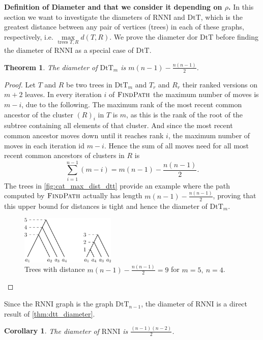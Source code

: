 \documentclass[11pt]{amsart}
\newtheorem{theorem}{Theorem}
\newtheorem{corollary}{Corollary}
\newcommand{\rnni}{\mathrm{RNNI}}
\newcommand{\findpath}{\textsc{FindPath}}
\newcommand{\dtt}{\mathrm{DtT}}
\newcommand{\summary}[1]{\textbf{#1}} %
\begin{document}
\summary{Definition of Diameter and that we consider it depending on $\rho$.}
In this section we want to investigate the diameters of $\rnni$ and $\dtt$, which is the greatest distance between any pair of vertices (trees) in each of these graphs, respectively, i.e. $\max\limits_{\text{trees }T,R}d(T,R)$.
We prove the diameter dor $\dtt$ before finding the diameter of $\rnni$ as a special case of $\dtt$.


\begin{theorem}
	The diameter of $\dtt_m$ is $m(n-1) - \frac{n(n-1)}{2}$.
	\label{thm:dtt_diameter}
\end{theorem}

\begin{proof}
	Let $T$ and $R$ be two trees in $\dtt_m$ and $T_r$ and $R_r$ their ranked versions on $m+2$ leaves.
	In every iteration $i$ of $\findpath$ the maximum number of moves is $m-i$, due to the following.
	The maximum rank of the most recent common ancestor of the cluster $(R)_i$ in $T$ is $m$, as this is the rank of the root of the subtree containing all elements of that cluster.
	And since the most recent common ancestor moves down until it reaches rank $i$, the maximum number of moves in each iteration id $m-i$.
	Hence the sum of all moves need for  all most recent common ancestors of clusters in $R$ is
	\[\sum\limits_{i = 1}^{n-1} (m - i) = m(n-1) - \frac{n(n-1)}{2}.\]
	The trees in \autoref{fig:cat_max_dist_dtt} provide an example where the path computed by $\findpath$ actually has length $m(n-1) - \frac{n(n-1)}{2}$, proving that this upper bound for distances is tight and hence the diameter of $\dtt_m$.

	\begin{figure}[ht]
		\includegraphics[width=0.4\textwidth]{cat_max_dist_dtt.eps}
		\caption{Trees with distance $m(n-1) - \frac{n(n-1)}{2} = 9$ for $m = 5,\ n = 4$.}
		\label{fig:cat_max_dist_dtt}
	\end{figure}
\end{proof}

Since the $\rnni$ graph is the graph $\dtt_{n-1}$, the diameter of $\rnni$ is a direct result of \autoref{thm:dtt_diameter}.

\begin{corollary}
	The diameter of $\rnni$ is $\frac{(n-1)(n-2)}{2}$.
	\label{cor:diameter_rnni}
\end{corollary}
\end{document}
